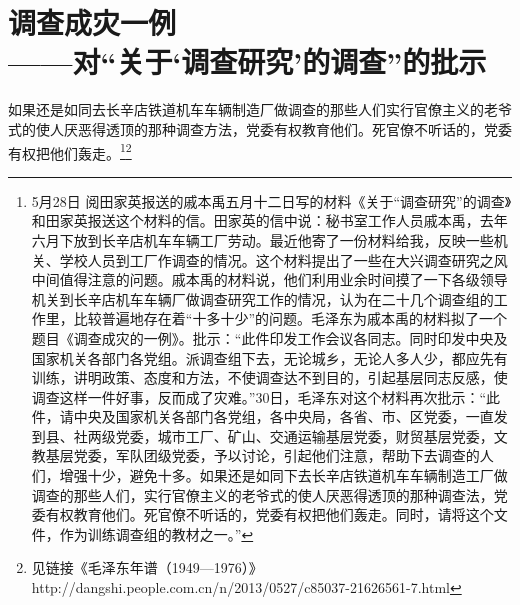 \section[调查成灾一例（一九六一年五月三十日）]{调查成灾一例\\{\large——对“关于‘调查研究’的调查”的批示}}

如果还是如同去长辛店铁道机车车辆制造厂做调查的那些人们实行官僚主义的老爷式的使人厌恶得透顶的那种调查方法，党委有权教育他们。死官僚不听话的，党委有权把他们轰走。\footnote{5月28日 阅田家英报送的戚本禹五月十二日写的材料《关于“调查研究”的调查》和田家英报送这个材料的信。田家英的信中说：秘书室工作人员戚本禹，去年六月下放到长辛店机车车辆工厂劳动。最近他寄了一份材料给我，反映一些机关、学校人员到工厂作调查的情况。这个材料提出了一些在大兴调查研究之风中间值得注意的问题。戚本禹的材料说，他们利用业余时间摸了一下各级领导机关到长辛店机车车辆厂做调查研究工作的情况，认为在二十几个调查组的工作里，比较普遍地存在着“十多十少”的问题。毛泽东为戚本禹的材料拟了一个题目《调查成灾的一例》。批示：“此件印发工作会议各同志。同时印发中央及国家机关各部门各党组。派调查组下去，无论城乡，无论人多人少，都应先有训练，讲明政策、态度和方法，不使调查达不到目的，引起基层同志反感，使调查这样一件好事，反而成了灾难。”30日，毛泽东对这个材料再次批示：“此件，请中央及国家机关各部门各党组，各中央局，各省、市、区党委，一直发到县、社两级党委，城市工厂、矿山、交通运输基层党委，财贸基层党委，文教基层党委，军队团级党委，予以讨论，引起他们注意，帮助下去调查的人们，增强十少，避免十多。如果还是如同下去长辛店铁道机车车辆制造工厂做调查的那些人们，实行官僚主义的老爷式的使人厌恶得透顶的那种调查法，党委有权教育他们。死官僚不听话的，党委有权把他们轰走。同时，请将这个文件，作为训练调查组的教材之一。”}\footnote{见链接《毛泽东年谱（1949—1976）》http://dangshi.people.com.cn/n/2013/0527/c85037-21626561-7.html}
